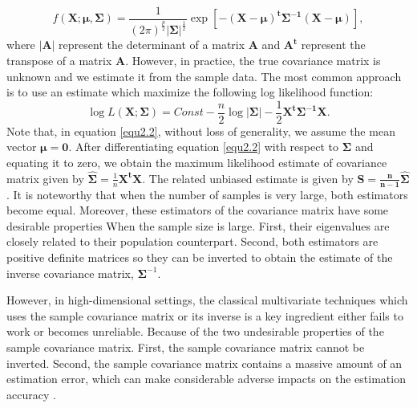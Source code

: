  \begin{equation}
 f(\textbf{X};\boldsymbol{\mu},\boldsymbol{\Sigma}) = \frac{1}{(2\pi)^\frac{p}{2}\left|\boldsymbol{\Sigma}\right|^\frac{1}{2}} \exp[{-\boldsymbol{(X-\mu)^t \Sigma^{-1} (X-\mu)}}],
  \label{equ2.1}
 \end{equation}
where $\boldsymbol{\left|A\right|}$ represent the determinant of a matrix $\boldsymbol{A}$ and $\boldsymbol{A^t}$ represent the transpose of a matrix $\boldsymbol{A}$. However, in practice, the true covariance matrix is unknown and we estimate it from the sample data. The most common approach is to use an estimate which maximize the following log likelihood function:
\begin{equation}
\log L(\boldsymbol{X};\boldsymbol{\Sigma})= Const - \frac{n}{2} \log \left|\boldsymbol{\Sigma}\right|-\frac{1}{2}\boldsymbol{X^t \Sigma^{-1} X}. 
\label{equ2.2} 
\end{equation}  
 Note that, in equation \ref{equ2.2}, without loss of generality, we assume the mean vector $\boldsymbol{\mu}= \textbf{0}$. After differentiating equation \ref{equ2.2} with respect to $\boldsymbol{\Sigma}$ and equating it to zero, we obtain the maximum likelihood estimate of covariance matrix given by $\widehat{\boldsymbol{\Sigma}}=\frac{1}{n}\boldsymbol{X^t X}$. The related unbiased estimate is given by $\boldsymbol{S=\frac{n}{n-1} \widehat{\Sigma}}$. It is noteworthy that when the number of samples is very large, both estimators become equal. Moreover, these estimators of the covariance matrix have some desirable properties When the sample size is large. First, their eigenvalues are closely related to their population counterpart. Second, both estimators are positive definite matrices so they can be inverted to obtain the estimate of the inverse covariance matrix, $\boldsymbol{\Sigma}^{-1}$.

      
      However, in high-dimensional settings, the classical multivariate techniques which uses the sample covariance matrix or its inverse is a key ingredient either fails to work or becomes unreliable. Because of the two undesirable properties of the sample covariance matrix. First, the sample covariance matrix cannot be inverted. Second, the sample covariance matrix contains a massive amount of an estimation error, which can make considerable adverse impacts on the estimation accuracy \citep{fan2016overview}.
      
